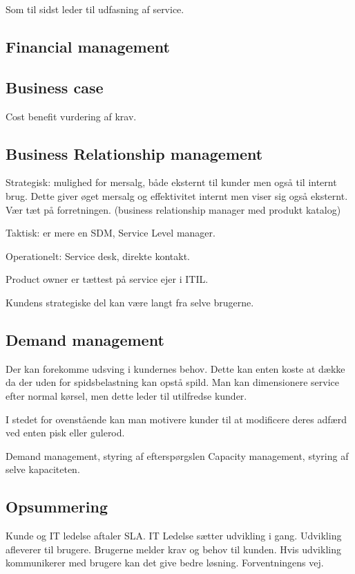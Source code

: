 Som til sidst leder til udfasning af service.

\subsection{Financial management}

\subsection{Business case}
Cost benefit vurdering af krav.


\subsection{Business Relationship management}
Strategisk: mulighed for mersalg, både eksternt til kunder men også til internt brug. Dette giver øget mersalg og effektivitet internt men viser sig også eksternt. Vær tæt på forretningen. (business relationship manager med produkt katalog)

Taktisk: er mere en SDM, Service Level manager. 

Operationelt: Service desk, direkte kontakt.

Product owner er tættest på service ejer i ITIL.

Kundens strategiske del kan være langt fra selve brugerne.

\subsection{Demand management}
Der kan forekomme udsving i kundernes behov. Dette kan enten koste at dække da der uden for spidsbelastning kan opstå spild. Man kan dimensionere service efter normal kørsel, men dette leder til utilfredse kunder.

I stedet for ovenstående kan man motivere kunder til at modificere deres adfærd ved enten pisk eller gulerod.

Demand management, styring af efterspørgslen
Capacity management, styring af selve kapaciteten.


\subsection{Opsummering}

Kunde og IT ledelse aftaler SLA. IT Ledelse sætter udvikling i gang. Udvikling afleverer til brugere. Brugerne melder krav og behov til kunden. Hvis udvikling kommunikerer med brugere kan det give bedre løsning. Forventningens vej.

